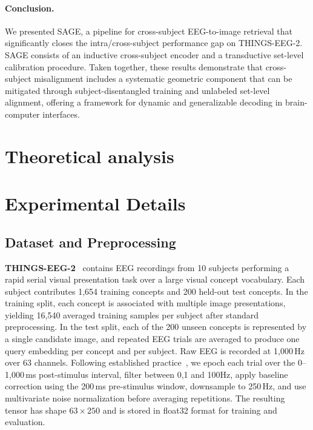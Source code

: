 \documentclass{article}
\begin{document}
\paragraph{Conclusion.}
We presented SAGE, a pipeline for cross-subject EEG-to-image retrieval that significantly closes the intra/cross-subject performance gap on THINGS-EEG-2. SAGE consists of an inductive cross-subject encoder and a transductive set-level calibration procedure. Taken together, these results demonstrate that cross-subject misalignment includes a systematic geometric component that can be mitigated through subject-disentangled training and unlabeled set-level alignment, offering a framework for dynamic and generalizable decoding in brain-computer interfaces.

\newpage



\newpage


\appendix


\section{Theoretical analysis}


\section{Experimental Details}
\label{app:exp-details}

\subsection{Dataset and Preprocessing}
\label{app:dataset-details}

\textbf{THINGS-EEG-2}~\cite{gifford2022things} contains EEG recordings from 10 subjects performing a rapid serial visual presentation task over a large visual concept vocabulary. Each subject contributes 1{,}654 training concepts and 200 held-out test concepts. In the training split, each concept is associated with multiple image presentations, yielding 16{,}540 averaged training samples per subject after standard preprocessing. In the test split, each of the 200 unseen concepts is represented by a single candidate image, and repeated EEG trials are averaged to produce one query embedding per concept and per subject. Raw EEG is recorded at 1{,}000\,Hz over 63 channels. Following established practice~\cite{song2024nice,li2024atm,wu2025ubp}, we epoch each trial over the 0--1{,}000\,ms post-stimulus interval, filter between 0,1 and 100Hz, apply baseline correction using the 200\,ms pre-stimulus window, downsample to 250\,Hz, and use multivariate noise normalization before averaging repetitions. The resulting tensor has shape $63 \times 250$ and is stored in float32 format for training and evaluation.
\end{document}
